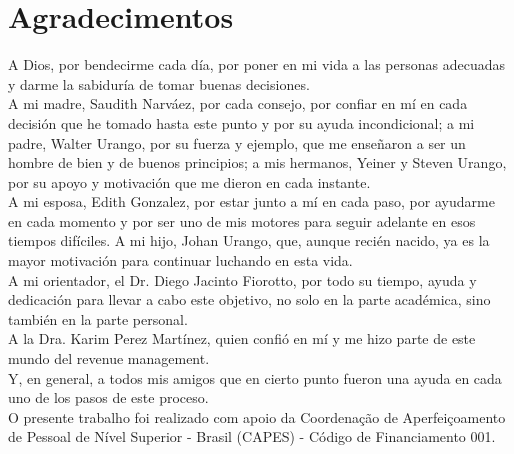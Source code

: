 \chapter*{Agradecimentos}


A Dios, por bendecirme cada día, por poner en mi vida a las personas adecuadas y darme la sabiduría de tomar buenas decisiones.
\\

A mi madre, Saudith Narváez, por cada consejo, por confiar en mí en cada decisión que he tomado hasta este punto y por su ayuda incondicional; a mi padre, Walter Urango, por su fuerza y ejemplo, que me enseñaron a ser un hombre de bien y de buenos principios; a mis hermanos, Yeiner y Steven Urango, por su apoyo y motivación que me dieron en cada instante.
\\

A mi esposa, Edith Gonzalez, por estar junto a mí en cada paso, por ayudarme en cada momento y por ser uno de mis motores para seguir adelante en esos tiempos difíciles. A mi hijo, Johan Urango, que, aunque recién nacido, ya es la mayor motivación para continuar luchando en esta vida.
\\

A mi orientador, el Dr. Diego Jacinto Fiorotto, por todo su tiempo, ayuda y dedicación para llevar a cabo este objetivo, no solo en la parte académica, sino también en la parte personal.
\\

A la Dra. Karim Perez Martínez, quien confió en mí y me hizo parte de este mundo del revenue management.
\\

Y, en general, a todos mis amigos que en cierto punto fueron una ayuda en cada uno de los pasos de este proceso.
\\

O presente trabalho foi realizado com apoio da Coordenação de Aperfeiçoamento de Pessoal de Nível Superior - Brasil (CAPES) - Código de Financiamento 001.


